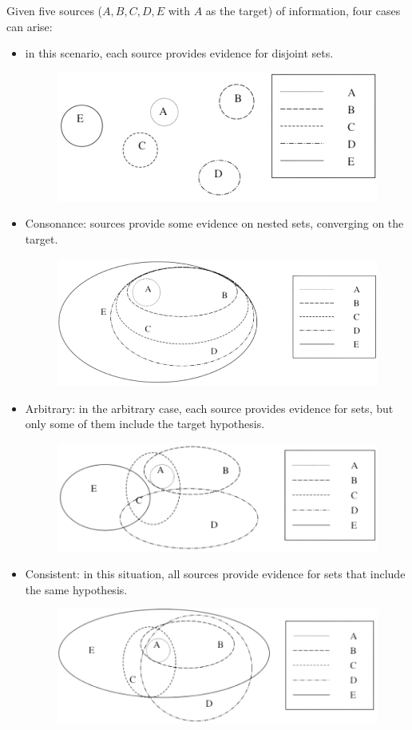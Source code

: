 \documentclass[12pt, a4paper]{report}
\begin{document}
    Given five sources ($A, B, C, D, E$ with $A$ as the target) of information, four cases can arise:
    \begin{itemize}
        \item in this scenario, each source provides evidence for disjoint sets.
            \begin{figure}[H]
                \centering
                \includegraphics[width=0.5\linewidth]{images/conflict.png}
            \end{figure}
        \item Consonance: sources provide some evidence on nested sets, converging on the target.
            \begin{figure}[H]
                \centering
                \includegraphics[width=0.5\linewidth]{images/consonance.png}
            \end{figure}
        \item Arbitrary: in the arbitrary case, each source provides evidence for sets, but only some of them include the target hypothesis.
            \begin{figure}[H]
                \centering
                \includegraphics[width=0.5\linewidth]{images/arbitrary.png}
            \end{figure}
        \item Consistent: in this situation, all sources provide evidence for sets that include the same hypothesis.
            \begin{figure}[H]
                \centering
                \includegraphics[width=0.5\linewidth]{images/consistent.png}
            \end{figure}
    \end{itemize}
\end{document}
